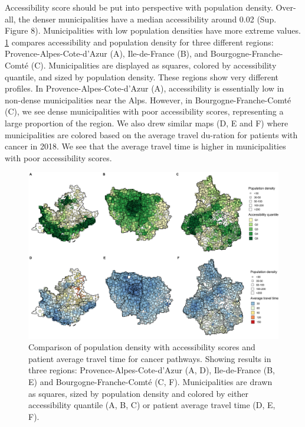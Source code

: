 Accessibility score should be put into perspective with population density. Over-all, the denser municipalities have a median accessibility around 0.02 (Sup. Figure 8). Municipalities with low population densities have more extreme values.  \cref{fig:accessibility-vs-density} compares accessibility and population density for three different regions: Provence-Alpes-Cote-d'Azur (A), Ile-de-France (B), and Bourgogne-Franche-Comté (C). Municipalities are displayed as squares, colored by accessibility quantile, and sized by population density. These regions show very different profiles. In Provence-Alpes-Cote-d'Azur (A), accessibility is essentially low in non-dense municipalities near the Alps. However, in Bourgogne-Franche-Comté (C), we see dense municipalities with poor accessibility scores, representing a large proportion of the region. We also drew similar maps (D, E and F) where municipalities are colored based on the average travel du-ration for patients with cancer in 2018. We see that the average travel time is higher in municipalities with poor accessibility scores.

\begin{figure}[h]
    \includegraphics[width=\textwidth]{images/camion/fig3_accessibility_vs_density_scatter_map.png}
    \centering
    \caption{
        Comparison of population density with accessibility scores and patient average travel time for cancer pathways. Showing results in three regions: Provence-Alpes-Cote-d’Azur (A, D), Ile-de-France (B, E) and Bourgogne-Franche-Comté (C, F). Municipalities are drawn as squares, sized by population density and colored by either accessibility quantile (A, B, C) or patient average travel time (D, E, F).
    }
    \label{fig:accessibility-vs-density}
\end{figure}

